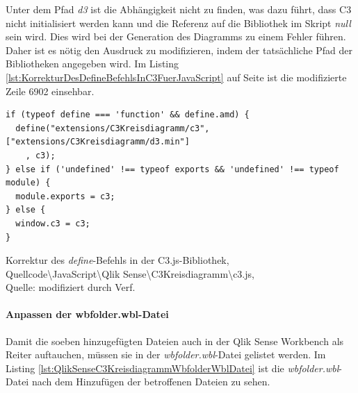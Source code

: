 Unter dem Pfad \textit{d3} ist die Abhängig\-keit nicht zu finden, was dazu führt, dass C3 nicht initialisiert werden kann und die Referenz auf die Bibliothek im Skript \textit{null} sein wird. Dies wird bei der Generation des Diagramms zu einem Fehler führen. Daher ist es nötig den Ausdruck zu modifizieren, indem der tatsächliche Pfad der Bibliotheken angegeben wird. Im Listing \ref{lst:KorrekturDesDefineBefehlsInC3FuerJavaScript} auf Seite \pageref{lst:KorrekturDesDefineBefehlsInC3FuerJavaScript} ist die modifizierte Zeile 6902 einsehbar.

\begin{listing}[htbp]
\begin{verbatim}
if (typeof define === 'function' && define.amd) {
  define("extensions/C3Kreisdiagramm/c3", ["extensions/C3Kreisdiagramm/d3.min"]
    , c3);
} else if ('undefined' !== typeof exports && 'undefined' !== typeof module) {
  module.exports = c3;
} else {
  window.c3 = c3;
}
\end{verbatim}
\caption[Korrektur des \textit{define}-Befehls in der C3.js-Bibliothek]{Korrektur des \textit{define}-Befehls in der C3.js-Bibliothek, \\Quellcode\textbackslash{}JavaScript\textbackslash{}Qlik Sense\textbackslash{}C3Kreisdiagramm\textbackslash{}c3.js, \\Quelle: \cite{c3masayuki0812c3} modifiziert durch Verf.}
\label{lst:KorrekturDesDefineBefehlsInC3FuerJavaScript}
\end{listing}

\newpage
\paragraph{Anpassen der wbfolder.wbl-Datei}

Damit die soeben hinzugefügten Dateien auch in der Qlik Sense Workbench als Reiter auftauchen, müssen sie in der \textit{wbfolder.wbl}-Datei gelistet werden. Im Listing \ref{lst:QlikSenseC3KreisdiagrammWbfolderWblDatei} ist die \textit{wbfolder.wbl}-Datei nach dem Hinzufügen der betroffenen Dateien zu sehen.

